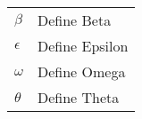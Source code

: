 \documentclass[reqno,12pt,oneside]{report}
\renewcommand\bibname{References}
\theoremstyle{plain}
\theoremstyle{definition}
\theoremstyle{remark}
\numberwithin{theorem}{chapter}
\begin{document}
\begin{tabular}{p{2.5cm}p{10cm}}
$\beta$   & Define Beta\\
$\epsilon$  & Define Epsilon\\
$\omega$& Define Omega\\
$\theta$   & Define Theta\\
\end{tabular}


\listoffigures   %
\tableofcontents     %
\printnomenclature[1.5cm]

\startthechapters

 \label{chap0:Introduction}
 

 \label{chap1:Literature}
 

 \label{chap2:SystemModel}
 
 
 \label{chap3:Result and Analysis}
 

 
 \label{chap3:Conclusion}
 

\label{chap4:Reference}


\end{document}
